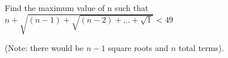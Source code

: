 Find the maximum value of n such that $n+ \sqrt{(n - 1) +\sqrt{(n - 2) + ... +\sqrt{1}}} < 49$

(Note: there would be $n - 1$ square roots and $n$ total terms).
